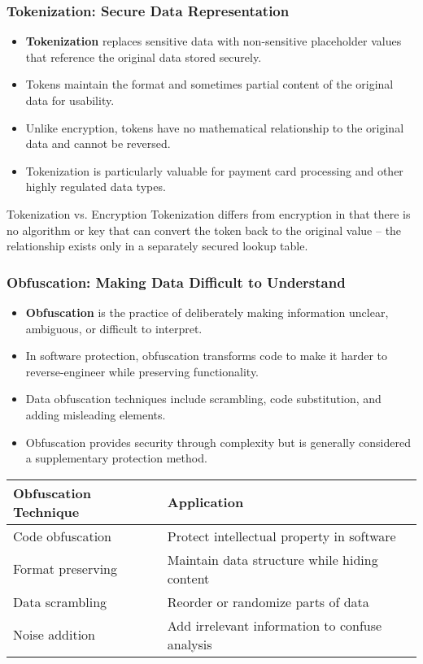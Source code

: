 \documentclass{beamer}
\begin{document}
\begin{frame}
\frametitle{Tokenization: Secure Data Representation}
\begin{itemize}
    \item \textbf{Tokenization} replaces sensitive data with non-sensitive placeholder values that reference the original data stored securely.
    \item Tokens maintain the format and sometimes partial content of the original data for usability.
    \item Unlike encryption, tokens have no mathematical relationship to the original data and cannot be reversed.
    \item Tokenization is particularly valuable for payment card processing and other highly regulated data types.
\end{itemize}

\begin{alertblock}{Tokenization vs. Encryption}
Tokenization differs from encryption in that there is no algorithm or key that can convert the token back to the original value – the relationship exists only in a separately secured lookup table.
\end{alertblock}
\end{frame}

\begin{frame}
\frametitle{Obfuscation: Making Data Difficult to Understand}
\begin{itemize}
    \item \textbf{Obfuscation} is the practice of deliberately making information unclear, ambiguous, or difficult to interpret.
    \item In software protection, obfuscation transforms code to make it harder to reverse-engineer while preserving functionality.
    \item Data obfuscation techniques include scrambling, code substitution, and adding misleading elements.
    \item Obfuscation provides security through complexity but is generally considered a supplementary protection method.
\end{itemize}

\begin{table}
\begin{tabular}{|l|l|}
\hline
\textbf{Obfuscation Technique} & \textbf{Application} \\
\hline
Code obfuscation & Protect intellectual property in software \\
\hline
Format preserving & Maintain data structure while hiding content \\
\hline
Data scrambling & Reorder or randomize parts of data \\
\hline
Noise addition & Add irrelevant information to confuse analysis \\
\hline
\end{tabular}
\end{table}
\end{frame}
\end{document}
